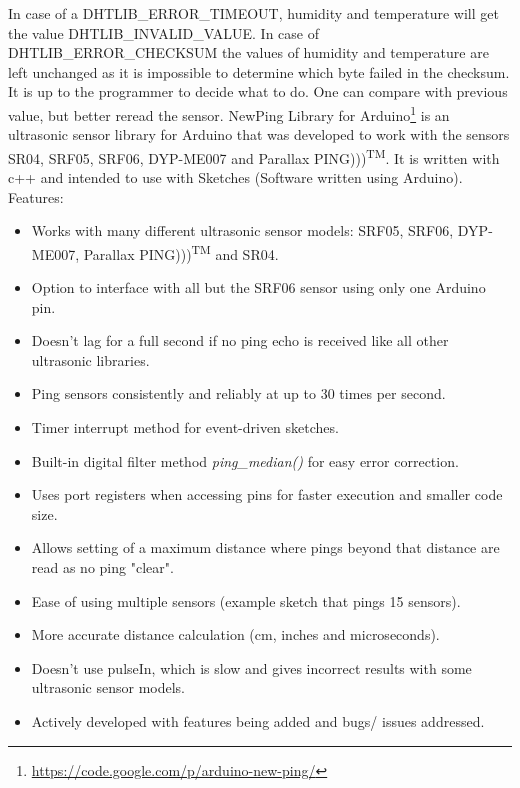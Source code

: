 \documentclass{acm_proc_article-sp}
\begin{document}
In case of a DHTLIB\_ERROR\_TIMEOUT, humidity and temperature will get the value DHTLIB\_INVALID\_VALUE. In case of DHTLIB\_ERROR\_CHECKSUM the values of humidity and temperature are left unchanged as it is impossible to determine which byte failed in the checksum. It is up to the programmer to decide what to do. One can compare with previous value, but better reread the sensor.
\newline
\newline
NewPing Library for Arduino\footnote{\url{https://code.google.com/p/arduino-new-ping/}}  is an ultrasonic sensor library for Arduino that was developed to work with the sensors SR04, SRF05, SRF06, DYP-ME007 and Parallax PING)))\textsuperscript{TM}. It is written with c++ and intended to use with Sketches (Software written using Arduino). 
\newline
\newline
Features:
\begin{itemize}
\item Works with many different ultrasonic sensor models: SRF05, SRF06, DYP-ME007, Parallax PING)))\textsuperscript{TM} and SR04.
\item Option to interface with all but the SRF06 sensor using only one Arduino pin.
\item Doesn't lag for a full second if no ping echo is received like all other ultrasonic libraries.
\item Ping sensors consistently and reliably at up to 30 times per second.
\item Timer interrupt method for event-driven sketches.
\item Built-in digital filter method \textit{ping\_median()} for easy error correction.
\item Uses port registers when accessing pins for faster execution and smaller code size.
\item Allows setting of a maximum distance where pings beyond that distance are read as no ping "clear".
\item Ease of using multiple sensors (example sketch that pings 15 sensors).
\item More accurate distance calculation (cm, inches and microseconds).
\item Doesn't use pulseIn, which is slow and gives incorrect results with some ultrasonic sensor models.
\item Actively developed with features being added and bugs/ issues addressed. 
\end{itemize}
\end{document}
